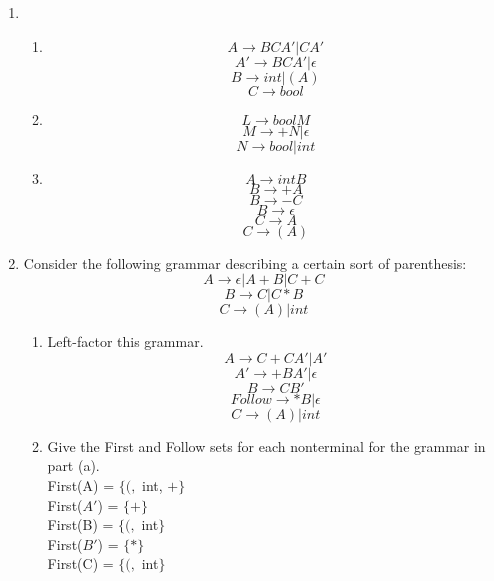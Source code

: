 
\usepackage{amsmath, verbatim, tikz, float, dsfont}

\oddsidemargin 0in
\evensidemargin 0in
\textwidth 6.5in
\topmargin -0.5in
\textheight 9.0in
\newcommand{\norm}[1]{\left\lVert #1 \right\rVert}
\newcommand{\?}{\stackrel{?}{=}}



\pagestyle{myheadings}


\begin{enumerate}
    \item 
          \begin{enumerate}
          \item
                $$A \rightarrow B C A' | C A'$$
                $$A' \rightarrow B C A' | \epsilon$$
                $$B \rightarrow int | (A)$$
                $$C \rightarrow bool$$

          \item
                $$L \rightarrow bool M$$
                $$M \rightarrow + N | \epsilon$$
                $$N \rightarrow bool | int$$

          \item
                $$A \rightarrow int B$$
                $$B \rightarrow + A$$
                $$B \rightarrow - C$$
                $$B \rightarrow \epsilon$$
                $$C \rightarrow A$$
                $$C \rightarrow (A)$$
          \end{enumerate}

    \item Consider the following grammar describing a certain sort of parenthesis:
          $$A \rightarrow \epsilon | A + B | C + C$$
          $$B \rightarrow C | C * B$$
          $$C \rightarrow (A) | int$$

          \begin{enumerate}
          \item Left-factor this grammar.\\
                $$A \rightarrow C + CA' | A'$$
                $$A' \rightarrow + B A' | \epsilon$$
                $$B \rightarrow C B'$$
                $$Follow \rightarrow * B | \epsilon$$
                $$C \rightarrow (A) | int$$

          \item Give the First and Follow sets for each nonterminal for the grammar in part (a).\\

          First(A) = $\{(,$ int, $+\}$\\
          First($A'$) = $\{+\}$\\
          First(B) = $\{(,$ int$\}$\\
          First($B'$) = $\{*\}$\\
          First(C) = $\{(,$ int$\}$\\


\end{enumerate}
\end{enumerate}

